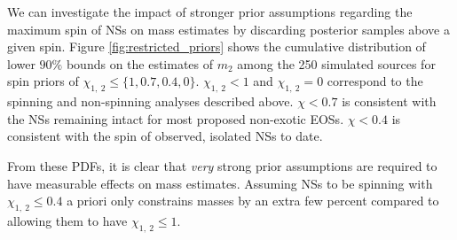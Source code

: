 We can investigate the impact of stronger prior assumptions regarding the maximum spin of NSs on mass estimates by discarding posterior samples above a given spin.  Figure \ref{fig:restricted_priors} shows the cumulative distribution of lower $90\%$ bounds on the estimates of $m_2$ among the 250 simulated sources for spin priors of $\chi_{1,~2} \leq \{1, 0.7, 0.4, 0\}$.  $\chi_{1,~2}<1$ and $\chi_{1,~2}=0$ correspond to the spinning and non-spinning analyses described above.  $\chi<0.7$ is consistent with the NSs remaining intact for most proposed non-exotic EOSs.  $\chi<0.4$ is consistent with the spin of observed, isolated NSs to date.

From these PDFs, it is clear that \textit{very} strong prior assumptions are required to have measurable effects on mass estimates. Assuming NSs to be spinning with $\chi_{1,~2}\leq 0.4$ a priori only constrains masses by an extra few percent compared to allowing them to have $\chi_{1,~2} \leq 1$.
  
  
  
  